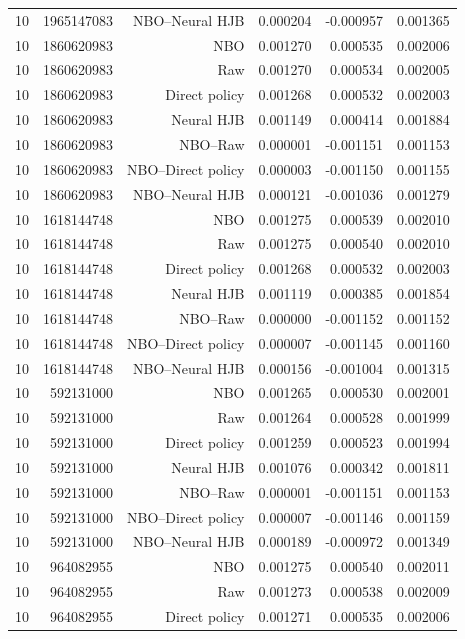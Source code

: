 \begin{longtable}{lrrrrr}
10 & 1965147083 & NBO--Neural HJB & 0.000204 & -0.000957 & 0.001365 \\
10 & 1860620983 & NBO & 0.001270 & 0.000535 & 0.002006 \\
10 & 1860620983 & Raw & 0.001270 & 0.000534 & 0.002005 \\
10 & 1860620983 & Direct policy & 0.001268 & 0.000532 & 0.002003 \\
10 & 1860620983 & Neural HJB & 0.001149 & 0.000414 & 0.001884 \\
10 & 1860620983 & NBO--Raw & 0.000001 & -0.001151 & 0.001153 \\
10 & 1860620983 & NBO--Direct policy & 0.000003 & -0.001150 & 0.001155 \\
10 & 1860620983 & NBO--Neural HJB & 0.000121 & -0.001036 & 0.001279 \\
10 & 1618144748 & NBO & 0.001275 & 0.000539 & 0.002010 \\
10 & 1618144748 & Raw & 0.001275 & 0.000540 & 0.002010 \\
10 & 1618144748 & Direct policy & 0.001268 & 0.000532 & 0.002003 \\
10 & 1618144748 & Neural HJB & 0.001119 & 0.000385 & 0.001854 \\
10 & 1618144748 & NBO--Raw & 0.000000 & -0.001152 & 0.001152 \\
10 & 1618144748 & NBO--Direct policy & 0.000007 & -0.001145 & 0.001160 \\
10 & 1618144748 & NBO--Neural HJB & 0.000156 & -0.001004 & 0.001315 \\
10 & 592131000 & NBO & 0.001265 & 0.000530 & 0.002001 \\
10 & 592131000 & Raw & 0.001264 & 0.000528 & 0.001999 \\
10 & 592131000 & Direct policy & 0.001259 & 0.000523 & 0.001994 \\
10 & 592131000 & Neural HJB & 0.001076 & 0.000342 & 0.001811 \\
10 & 592131000 & NBO--Raw & 0.000001 & -0.001151 & 0.001153 \\
10 & 592131000 & NBO--Direct policy & 0.000007 & -0.001146 & 0.001159 \\
10 & 592131000 & NBO--Neural HJB & 0.000189 & -0.000972 & 0.001349 \\
10 & 964082955 & NBO & 0.001275 & 0.000540 & 0.002011 \\
10 & 964082955 & Raw & 0.001273 & 0.000538 & 0.002009 \\
10 & 964082955 & Direct policy & 0.001271 & 0.000535 & 0.002006 \\

\end{longtable}
